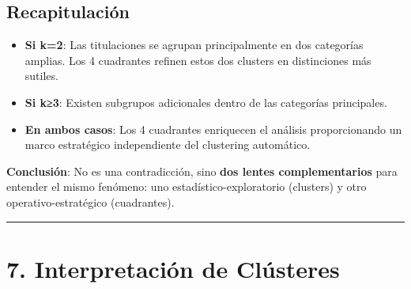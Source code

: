 \documentclass[
]{article}
\providecommand{\tightlist}{%
  \setlength{\itemsep}{0pt}\setlength{\parskip}{0pt}}
\begin{document}
\subsection{Recapitulación}\label{recapitulaciuxf3n}

\begin{itemize}
\tightlist
\item
  \textbf{Si k=2}: Las titulaciones se agrupan principalmente en dos
  categorías amplias. Los 4 cuadrantes refinen estos dos clusters en
  distinciones más sutiles.
\item
  \textbf{Si k≥3}: Existen subgrupos adicionales dentro de las
  categorías principales.
\item
  \textbf{En ambos casos}: Los 4 cuadrantes enriquecen el análisis
  proporcionando un marco estratégico independiente del clustering
  automático.
\end{itemize}

\textbf{Conclusión}: No es una contradicción, sino \textbf{dos lentes
complementarios} para entender el mismo fenómeno: uno
estadístico-exploratorio (clusters) y otro operativo-estratégico
(cuadrantes).

\begin{center}\rule{0.5\linewidth}{0.5pt}\end{center}

\section{7. Interpretación de
Clústeres}\label{interpretaciuxf3n-de-cluxfasteres}
\end{document}
